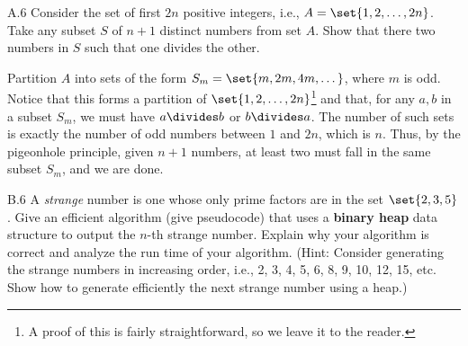 \documentclass[final]{article}
\begin{document}
\begin{exercise}{A.6}
    Consider the set of first $2n$ positive integers, i.e., $A = \set{1, 2, \dots, 2n}$. Take any subset $S$ of $n+1$ distinct numbers from set $A$. Show that there  two numbers in $S$ such that one divides the other.
\end{exercise}

\begin{solution}
    Partition $A$ into sets of the form $S_m = \set{m, 2m, 4m, \dots}$, where $m$ is
    odd. Notice that this forms a partition of $\set{1, 2, \dots, 2n}$\footnote{A proof of this is fairly
        straightforward, so we leave it to the reader.} and that, for any $a, b$ in
    a subset $S_m$, we must have $a \divides b$ or $b \divides a$. The number of
    such sets is exactly the number of odd numbers between $1$ and $2n$, which
    is $n$. Thus, by the pigeonhole principle, given $n + 1$ numbers, at least
    two must fall in the same subset $S_m$, and we are done.
\end{solution}

\begin{exercise}{B.6}
    A \emph{strange} number is one whose only prime factors are in the set $\set{2, 3, 5}$.
    Give an efficient algorithm (give pseudocode) that uses a \textbf{binary heap} data structure to output the $n$-th strange number.  Explain why your algorithm is correct and analyze the run time of your algorithm. (Hint: Consider generating
    the strange numbers in increasing order, i.e., 2, 3, 4, 5, 6, 8, 9, 10, 12, 15, etc. Show how to generate efficiently the next strange
    number using a heap.)
\end{exercise}
\end{document}
